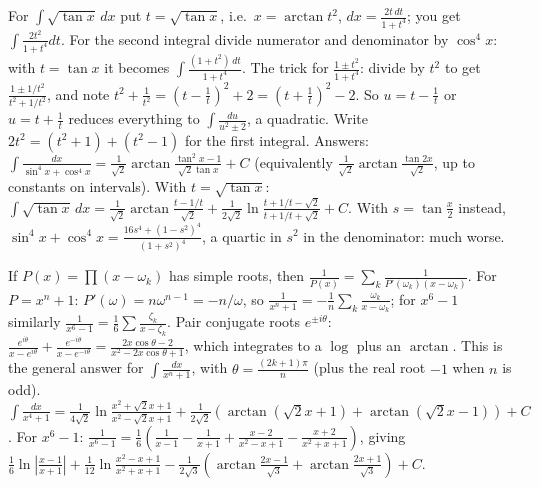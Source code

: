 \documentclass[11pt,a4paper]{article}
\begin{document}

For \(\int\sqrt{\tan x}\,dx\) put \(t=\sqrt{\tan x}\), i.e.~\(x=\arctan t^2\), \(dx=\frac{2t\,dt}{1+t^4}\); you get \(\int\frac{2t^2}{1+t^4}dt\). For the second integral divide numerator and denominator by \(\cos^4x\): with \(t=\tan x\) it becomes \(\int\frac{(1+t^2)\,dt}{1+t^4}\).
The trick for \(\frac{1\pm t^2}{1+t^4}\): divide by \(t^2\) to get \(\frac{1\pm 1/t^2}{t^2+1/t^2}\), and note \(t^2+\frac1{t^2}=(t-\frac1t)^2+2=(t+\frac1t)^2-2\). So \(u=t-\frac1t\) or \(u=t+\frac1t\) reduces everything to \(\int\frac{du}{u^2\pm 2}\), a quadratic. Write \(2t^2=(t^2+1)+(t^2-1)\) for the first integral.
Answers: \(\int\frac{dx}{\sin^4x+\cos^4x}=\frac1{\sqrt2}\arctan\frac{\tan^2x-1}{\sqrt2\tan x}+C\) (equivalently \(\frac1{\sqrt2}\arctan\frac{\tan2x}{\sqrt2}\), up to constants on intervals). With \(t=\sqrt{\tan x}\): \(\int\sqrt{\tan x}\,dx=\frac1{\sqrt2}\arctan\frac{t-1/t}{\sqrt2}+\frac1{2\sqrt2}\ln\frac{t+1/t-\sqrt2}{t+1/t+\sqrt2}+C\). With \(s=\tan\frac x2\) instead, \(\sin^4x+\cos^4x=\frac{16s^4+(1-s^2)^4}{(1+s^2)^4}\), a quartic in \(s^2\) in the denominator: much worse.

If \(P(x)=\prod(x-\omega_k)\) has simple roots, then \(\frac1{P(x)}=\sum_k\frac{1}{P'(\omega_k)(x-\omega_k)}\). For \(P=x^n+1\): \(P'(\omega)=n\omega^{n-1}=-n/\omega\), so \(\frac1{x^n+1}=-\frac1n\sum_k\frac{\omega_k}{x-\omega_k}\); for \(x^6-1\) similarly \(\frac1{x^6-1}=\frac16\sum\frac{\zeta_k}{x-\zeta_k}\).
Pair conjugate roots \(e^{\pm i\theta}\): \(\frac{e^{i\theta}}{x-e^{i\theta}}+\frac{e^{-i\theta}}{x-e^{-i\theta}}=\frac{2x\cos\theta-2}{x^2-2x\cos\theta+1}\), which integrates to a \(\log\) plus an \(\arctan\). This is the general answer for \(\int\frac{dx}{x^n+1}\), with \(\theta=\frac{(2k+1)\pi}{n}\) (plus the real root \(-1\) when \(n\) is odd).
\(\int\frac{dx}{x^4+1}=\frac1{4\sqrt2}\ln\frac{x^2+\sqrt2x+1}{x^2-\sqrt2x+1}+\frac1{2\sqrt2}\left(\arctan(\sqrt2x+1)+\arctan(\sqrt2x-1)\right)+C\). For \(x^6-1\): \(\frac1{x^6-1}=\frac16\left(\frac1{x-1}-\frac1{x+1}+\frac{x-2}{x^2-x+1}-\frac{x+2}{x^2+x+1}\right)\), giving \(\frac16\ln\left\lvert\frac{x-1}{x+1}\right\rvert+\frac1{12}\ln\frac{x^2-x+1}{x^2+x+1}-\frac1{2\sqrt3}\left(\arctan\frac{2x-1}{\sqrt3}+\arctan\frac{2x+1}{\sqrt3}\right)+C\).
\end{document}
